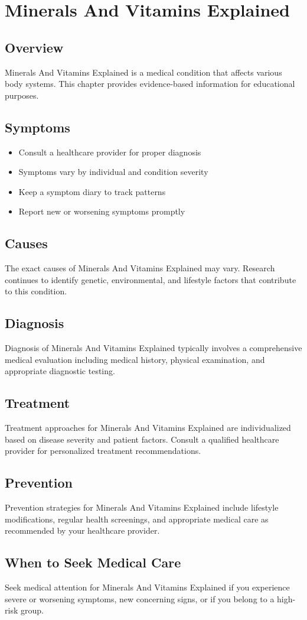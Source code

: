 \chapter{Minerals And Vitamins Explained}

\section*{Overview}
Minerals And Vitamins Explained is a medical condition that affects various body systems. This chapter provides evidence-based information for educational purposes.

\section*{Symptoms}
\begin{itemize}
  \item Consult a healthcare provider for proper diagnosis
  \item Symptoms vary by individual and condition severity
  \item Keep a symptom diary to track patterns
  \item Report new or worsening symptoms promptly
\end{itemize}

\section*{Causes}
The exact causes of Minerals And Vitamins Explained may vary. Research continues to identify genetic, environmental, and lifestyle factors that contribute to this condition.

\section*{Diagnosis}
Diagnosis of Minerals And Vitamins Explained typically involves a comprehensive medical evaluation including medical history, physical examination, and appropriate diagnostic testing.

\section*{Treatment}
Treatment approaches for Minerals And Vitamins Explained are individualized based on disease severity and patient factors. Consult a qualified healthcare provider for personalized treatment recommendations.

\section*{Prevention}
Prevention strategies for Minerals And Vitamins Explained include lifestyle modifications, regular health screenings, and appropriate medical care as recommended by your healthcare provider.

\section*{When to Seek Medical Care}
Seek medical attention for Minerals And Vitamins Explained if you experience severe or worsening symptoms, new concerning signs, or if you belong to a high-risk group.
\clearpage
